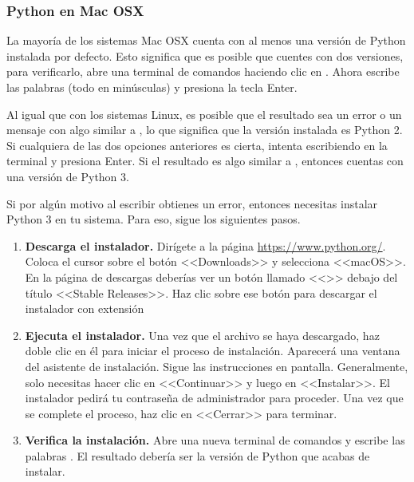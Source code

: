 \subsubsection{Python en Mac OSX}
La mayoría de los sistemas Mac OSX cuenta con al menos una versión de Python instalada por defecto. Esto significa que es posible que cuentes con dos versiones, para verificarlo, abre una terminal de comandos haciendo clic en . Ahora escribe las palabras  (todo en minúsculas) y presiona la tecla Enter. 

Al igual que con los sistemas Linux, es posible que el resultado sea un error o un mensaje con algo similar a , lo que significa que la versión instalada es Python 2. Si cualquiera de las dos opciones anteriores es cierta, intenta escribiendo en la terminal  y presiona Enter. Si el resultado es algo similar a , entonces cuentas con una versión de Python 3.

Si por algún motivo al escribir  obtienes un error, entonces necesitas instalar Python 3 en tu sistema. Para eso, sigue los siguientes pasos.

\begin{enumerate}
    \item \textbf{Descarga el instalador.} Dirígete a la página \url{https://www.python.org/}. Coloca el cursor sobre el botón <<Downloads>> y selecciona <<macOS>>. En la página de descargas deberías ver un botón llamado <<>> debajo del título <<Stable Releases>>. Haz clic sobre ese botón para descargar el instalador con extensión 

    \item \textbf{Ejecuta el instalador.} Una vez que el archivo  se haya descargado, haz doble clic en él para iniciar el proceso de instalación. Aparecerá una ventana del asistente de instalación. Sigue las instrucciones en pantalla. Generalmente, solo necesitas hacer clic en <<Continuar>> y luego en <<Instalar>>. El instalador pedirá tu contraseña de administrador para proceder. Una vez que se complete el proceso, haz clic en <<Cerrar>> para terminar.

    \item \textbf{Verifica la instalación.} Abre una nueva terminal de comandos y escribe las palabras . El resultado debería ser la versión de Python que acabas de instalar.
\end{enumerate}

